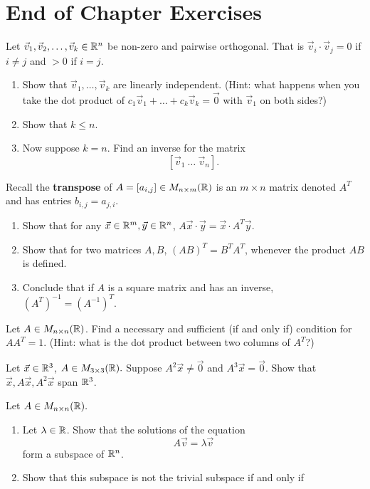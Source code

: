 \section{End of Chapter Exercises}
\begin{exerciselist}
	\item Let $\vec{v}_1,\vec{v}_2,\ldots,\vec{v}_k\in \mathbb{R}^n$ be non-zero and pairwise orthogonal. That is $\vec{v}_i\cdot\vec{v}_{j}=0$ if $i\neq j$ and $>0$ if $i=j$. \begin{enumerate} [label=(\alph*)]
		\item Show that $\vec{v}_1,\ldots,\vec{v}_k$ are linearly independent. (Hint: what happens when you take the dot product of $c_1\vec{v}_1+\ldots+c_k\vec{v}_k=\vec{0}$ with $\vec{v}_1$ on both sides?)
		\item Show that $k\leq n$.
		\item Now suppose $k=n$. Find an inverse for the matrix \[
		[\vec{v}_1 \ \ldots \ \vec{v}_n]. 
		\]
	\end{enumerate}
	\item Recall the \textbf{transpose} of $A=[a_{i,j}]\in M_{n\times m}(\mathbb{R})$ is an $m\times n$ matrix denoted $A^T$ and has entries $b_{i,j}=a_{j,i}$. \begin{enumerate}[label=(\alph*)]
		\item Show that for any $\vec{x}\in \mathbb{R}^m, \vec{y}\in \mathbb{R}^n$, $A\vec{x}\cdot \vec{y}=\vec{x}\cdot A^T\vec{y}.$
		\item Show that for two matrices $A,B$,  $(AB)^T=B^T A^T$, whenever the product $AB$ is defined.
		\item Conclude that if $A$ is a square matrix and has an inverse, $(A^T)^{-1}=(A^{-1})^T.$
	\end{enumerate}
	\item Let $A\in M_{n\times n}(\mathbb{R})$. Find a necessary and sufficient (if and only if) condition for $AA^T=1$. (Hint: what is the dot product between two columns of $A^T$?) 
	\item Let $\vec{x}\in \mathbb{R}^3$, $A\in M_{3\times 3}(\mathbb{R}).$ Suppose $A^2\vec{x}\neq\vec{0}$ and $A^3\vec{x}=\vec{0}$. Show that $\vec{x}, A\vec{x},A^2\vec{x}$ span $\mathbb{R}^3$.
	\item Let $A\in M_{n\times n}(\mathbb{R}).$
	\begin{enumerate}[label=(\alph*)]
		\item Let $\lambda\in\mathbb{R}$. Show that the solutions of the equation \[
			A\vec{v}=\lambda \vec{v}
			\]form a subspace of $\mathbb{R}^n$.
		\item Show that this subspace is not the trivial subspace if and only if \[
\]
\end{enumerate}
\end{exerciselist}

